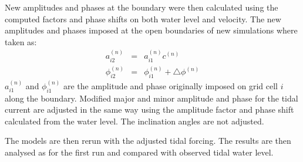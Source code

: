 New amplitudes and phases at the boundary were then calculated using the computed factors and phase shifts on both water level and velocity. The new amplitudes and phases imposed at the open boundaries of new simulations where taken as:
\begin{eqnarray}
a^{(n)}_{i2} &=& a^{(n)}_{i1} c^{(n)} \\
\phi^{(n)}_{i2} &=& \phi^{(n)}_{i1} + \triangle \phi^{(n)}
\end{eqnarray}
$a^{(n)}_{i1}$ and $\phi^{(n)}_{i1}$ are the amplitude and phase originally imposed on grid cell $i$ along the boundary. Modified major and minor amplitude and phase for the tidal current are adjusted in the same way using the amplitude factor and phase shift calculated from the water level. The inclination angles are not adjusted.

The models are then rerun with the adjusted tidal forcing. The results are then analysed as for the first run and  compared with observed tidal water level. 
